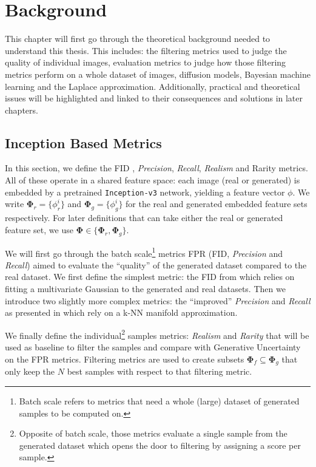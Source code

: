 \chapter{Background}
\label{ch:background}

This chapter will first go through the theoretical background needed to understand this thesis. This includes: the filtering metrics used to judge the quality of individual images, evaluation metrics to judge how those filtering metrics perform on a whole dataset of images, diffusion models, Bayesian machine learning and the Laplace approximation.
Additionally, practical and theoretical issues will be highlighted and linked to their consequences and solutions in later chapters.

\section{Inception Based Metrics}
\label{sec:inception_metrics}

In this section, we define the \acs{FID} \parencite{heusel_gans_2018}, \emph{Precision}, \emph{Recall}, \emph{Realism} \parencite{kynkaanniemi_improved_2019} and Rarity \parencite{han_rarity_2022} metrics. All of these operate in a shared feature space: each image (real or generated) is embedded by a pretrained \texttt{Inception-v3} network, yielding a feature vector $\phi$. We write $\boldsymbol{\Phi}_r = \{\phi_r^i\}$ and $\boldsymbol{\Phi}_g = \{\phi_g^i\}$ for the real and generated embedded feature sets respectively. For later definitions that can take either the real or generated feature set, we use $\boldsymbol{\Phi} \in \{\boldsymbol{\Phi}_r, \boldsymbol{\Phi}_g\}$.

We will first go through the batch scale\footnote{Batch scale refers to metrics that need a whole (large) dataset of generated samples to be computed on.} metrics \acs{FPR} (\acs{FID}, \emph{Precision} and \emph{Recall}) aimed to evaluate the ``quality'' of the generated dataset compared to the real dataset.
We first define the simplest metric: the \acs{FID} from \cite{heusel_gans_2018} which relies on fitting a multivariate Gaussian to the generated and real datasets. Then we introduce two slightly more complex metrics: the ``improved'' \emph{Precision} and \emph{Recall} as presented in \cite{kynkaanniemi_improved_2019} which rely on a k-NN manifold approximation.

We finally define the individual\footnote{Opposite of batch scale, those metrics evaluate a single sample from the generated dataset which opens the door to filtering by assigning a score per sample.} samples metrics: \emph{Realism} \parencite{kynkaanniemi_improved_2019} and \emph{Rarity} \parencite{han_rarity_2022} that will be used as baseline to filter the samples and compare with Generative Uncertainty on the \acs{FPR} metrics. Filtering metrics are used to create subsets $\boldsymbol\Phi_f \subseteq \boldsymbol\Phi_g$ that only keep the $N$ best samples with respect to that filtering metric.


